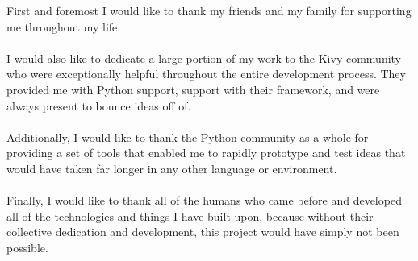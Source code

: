 First and foremost I would like to thank my friends and my family for supporting me throughout my life.
\\
\\
I would also like to dedicate a large portion of my work to the Kivy community who were exceptionally helpful throughout the entire development process. They provided me with Python support, support with their framework, and were always present to bounce ideas off of. 
\\
\\
Additionally, I would like to thank the Python community as a whole for providing a set of tools that enabled me to rapidly prototype and test ideas that would have taken far longer in any other language or environment.
\\
\\
Finally, I would like to thank all of the humans who came before and developed all of the technologies and things I have built upon, because without their collective dedication and development, this project would have simply not been possible.

